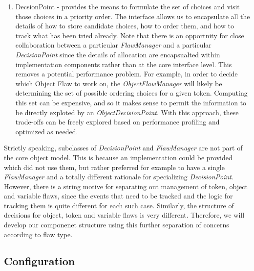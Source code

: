 \documentclass[10pt, letterpaper, oneside]{article}
\begin{document}
\begin{enumerate}
\item DecsionPoint - provides the means to formulate the set of choices and visit those choices in a priority order. The interface allows us to encapsulate all the details of how to store candidate choices, how to order them, and how to track what has been tried already. Note that there is an opportnity for close collaboration between a particular {\em FlawManager} and a particular {\em DecisionPoint} since the details of allocation are encapsualted within implementation components rather than at the core interface level. This removes a potential performance problem. For example, in order to decide which Object Flaw to work on, the {\em ObjectFlawManager} will likely be determining the set of possible ordering choices for a given token. Computing this set can be expensive, and so it makes sense to permit the information to be directly exploted by an {\em ObjectDecisionPoint}. With this approach, these trade-offs can be freely explored based on performance profiling and optimized as needed.
\end{enumerate}

Strictly speaking, subclasses of {\em DecisionPoint} and {\em FlawManager} are not part of the core object model. This is because an implementation could be provided which did not use them, but rather preferred for example to have a single {\em FlawManager} and a totally different rationale for specializing {\em DecisionPoint}. However, there is a string motive for separating out management of token, object and variable flaws, since the events that need to be tracked and the logic for tracking them is quite different for each such case. Similarly, the structure of decisions for object, token and variable flaws is very different. Therefore, we will develop our componenet structure using this further separation of concerns according to flaw type.

\subsection{Configuration}
\end{document}
